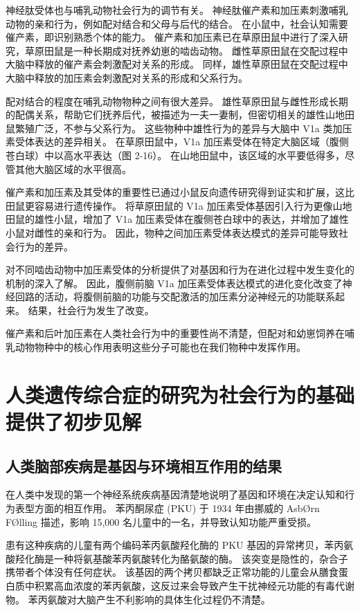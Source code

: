 神经肽受体也与哺乳动物社会行为的调节有关。 神经肽催产素和加压素刺激哺乳动物的亲和行为，例如配对结合和父母与后代的结合。 在小鼠中，社会认知需要催产素，即识别熟悉个体的能力。 催产素和加压素已在草原田鼠中进行了深入研究，草原田鼠是一种长期成对抚养幼崽的啮齿动物。 雌性草原田鼠在交配过程中大脑中释放的催产素会刺激配对关系的形成。 同样，雄性草原田鼠在交配过程中大脑中释放的加压素会刺激配对关系的形成和父系行为。

配对结合的程度在哺乳动物物种之间有很大差异。 雄性草原田鼠与雌性形成长期的配偶关系，帮助它们抚养后代，被描述为一夫一妻制，但密切相关的雄性山地田鼠繁殖广泛，不参与父系行为。 这些物种中雄性行为的差异与大脑中 V1a 类加压素受体表达的差异相关。 在草原田鼠中，V1a 加压素受体在特定大脑区域（腹侧苍白球）中以高水平表达（图 2-16）。 在山地田鼠中，该区域的水平要低得多，尽管其他大脑区域的水平很高。

催产素和加压素及其受体的重要性已通过小鼠反向遗传研究得到证实和扩展，这比田鼠更容易进行遗传操作。 将草原田鼠的 V1a 加压素受体基因引入行为更像山地田鼠的雄性小鼠，增加了 V1a 加压素受体在腹侧苍白球中的表达，并增加了雄性小鼠对雌性的亲和行为。 因此，物种之间加压素受体表达模式的差异可能导致社会行为的差异。

对不同啮齿动物中加压素受体的分析提供了对基因和行为在进化过程中发生变化的机制的深入了解。 因此，腹侧前脑 V1a 加压素受体表达模式的进化变化改变了神经回路的活动，将腹侧前脑的功能与交配激活的加压素分泌神经元的功能联系起来。 结果，社会行为发生了改变。

催产素和后叶加压素在人类社会行为中的重要性尚不清楚，但配对和幼崽饲养在哺乳动物物种中的核心作用表明这些分子可能也在我们物种中发挥作用。


\section{人类遗传综合症的研究为社会行为的基础提供了初步见解}
\subsection{人类脑部疾病是基因与环境相互作用的结果}
在人类中发现的第一个神经系统疾病基因清楚地说明了基因和环境在决定认知和行为表型方面的相互作用。 苯丙酮尿症 (PKU) 于 1934 年由挪威的 AsbØrn FØlling 描述，影响 15,000 名儿童中的一名，并导致认知功能严重受损。

患有这种疾病的儿童有两个编码苯丙氨酸羟化酶的 PKU 基因的异常拷贝，苯丙氨酸羟化酶是一种将氨基酸苯丙氨酸转化为酪氨酸的酶。 该突变是隐性的，杂合子携带者个体没有任何症状。 该基因的两个拷贝都缺乏正常功能的儿童会从膳食蛋白质中积累高血浓度的苯丙氨酸，这反过来会导致产生干扰神经元功能的有毒代谢物。 苯丙氨酸对大脑产生不利影响的具体生化过程仍不清楚。

